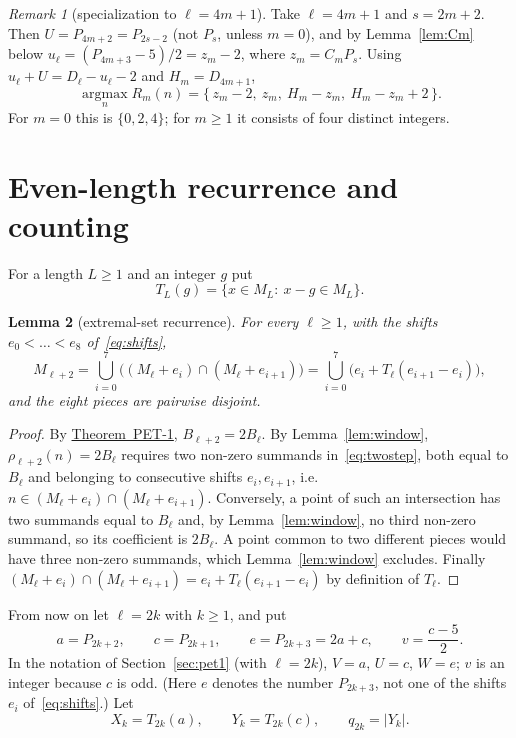 \documentclass[11pt]{amsart}
\newtheorem{lemma}{Lemma}[section]
\theoremstyle{definition}
\theoremstyle{remark}
\newtheorem{remark}[lemma]{Remark}
\theoremstyle{plain}
\numberwithin{equation}{section}
\newcommand{\argmax}{\operatorname*{argmax}}
\newcommand{\PETone}{\hyperref[thm:pet1]{Theorem~PET-1}}
\begin{document}
\begin{remark}[specialization to $\ell=4m+1$]\label{rem:special}
Take $\ell=4m+1$ and $s=2m+2$. Then $U=P_{4m+2}=P_{2s-2}$ (not $P_s$, unless $m=0$), and by
Lemma~\ref{lem:Cm} below $u_\ell=(P_{4m+3}-5)/2=z_m-2$, where $z_m=C_mP_s$. Using
$u_\ell+U=D_\ell-u_\ell-2$ and $H_m=D_{4m+1}$,
\[
\argmax_nR_m(n)=\{\,z_m-2,\ z_m,\ H_m-z_m,\ H_m-z_m+2\,\}.
\]
For $m=0$ this is $\{0,2,4\}$; for $m\ge1$ it consists of four distinct integers.
\end{remark}

\section{Even-length recurrence and counting}\label{sec:pet3}

For a length $L\ge1$ and an integer $g$ put
\[
T_L(g)=\{x\in M_L:\ x-g\in M_L\}.
\]

\begin{lemma}[extremal-set recurrence]\label{lem:setrec}
For every $\ell\ge1$, with the shifts $e_0<\dots<e_8$ of~\eqref{eq:shifts},
\[
M_{\ell+2}=\bigcup_{i=0}^{7}\bigl((M_\ell+e_i)\cap(M_\ell+e_{i+1})\bigr)
=\bigcup_{i=0}^{7}\bigl(e_i+T_\ell(e_{i+1}-e_i)\bigr),
\]
and the eight pieces are pairwise disjoint.
\end{lemma}

\begin{proof}
By \PETone, $B_{\ell+2}=2B_\ell$. By Lemma~\ref{lem:window}, $\rho_{\ell+2}(n)=2B_\ell$ requires two
non-zero summands in~\eqref{eq:twostep}, both equal to $B_\ell$ and belonging to consecutive shifts
$e_i,e_{i+1}$, i.e.\ $n\in(M_\ell+e_i)\cap(M_\ell+e_{i+1})$. Conversely, a point of such an
intersection has two summands equal to $B_\ell$ and, by Lemma~\ref{lem:window}, no third non-zero
summand, so its coefficient is $2B_\ell$. A point common to two different pieces would have three
non-zero summands, which Lemma~\ref{lem:window} excludes. Finally
$(M_\ell+e_i)\cap(M_\ell+e_{i+1})=e_i+T_\ell(e_{i+1}-e_i)$ by definition of $T_\ell$.
\end{proof}

From now on let $\ell=2k$ with $k\ge1$, and put
\[
a=P_{2k+2},\qquad c=P_{2k+1},\qquad e=P_{2k+3}=2a+c,\qquad v=\frac{c-5}{2}.
\]
In the notation of Section~\ref{sec:pet1} (with $\ell=2k$), $V=a$, $U=c$, $W=e$; $v$ is an integer
because $c$ is odd. (Here $e$ denotes the number $P_{2k+3}$, not one of the shifts $e_i$
of~\eqref{eq:shifts}.) Let
\[
X_k=T_{2k}(a),\qquad Y_k=T_{2k}(c),\qquad q_{2k}=|Y_k|.
\]
\end{document}
